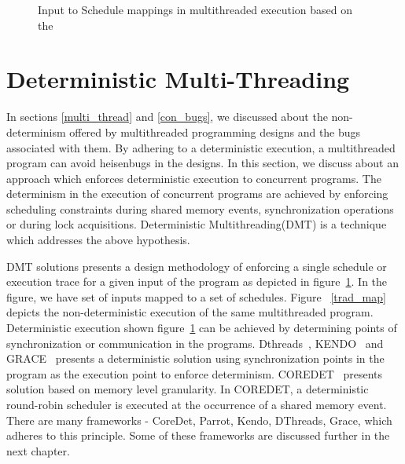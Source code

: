 \begin{figure}[h]
{\label{determinisitic_mapping}}
 \caption{Input to Schedule mappings in multithreaded execution based on the \citet{parrot}}
\end{figure}

\section{Deterministic Multi-Threading \label{sec_dmt}}

In sections \ref{multi_thread} and \ref{con_bugs}, we discussed about the non-determinism offered by multithreaded programming designs and the bugs associated with them. 
By adhering to a deterministic execution, a multithreaded program can avoid heisenbugs in the designs. 
In this section, we discuss about an approach which enforces deterministic execution to concurrent programs. 
The determinism in the execution of concurrent programs are achieved by enforcing scheduling constraints during shared memory events, synchronization operations or during lock acquisitions. 
Deterministic Multithreading(DMT) is a technique which addresses the above hypothesis. 

DMT solutions presents a design methodology of enforcing a single schedule or execution trace for a given input of the program as depicted in figure~\ref{determinisitic_mapping}. 
In the figure, we have set of inputs mapped to a set of schedules. 
Figure~ \ref{trad_map} depicts the non-deterministic execution of the same multithreaded program. 
Deterministic execution shown figure~\ref{determinisitic_mapping} can be achieved by determining points of synchronization or communication in the programs. 
Dthreads~\citep{dthreads}, KENDO~\citep{kendo} and GRACE~\citep{grace} presents a deterministic solution using synchronization points in the program as the execution point to enforce determinism. 
COREDET~\citep{coredet} presents solution based on memory level granularity. 
In COREDET, a deterministic round-robin scheduler is executed at the occurrence of a shared memory event. 
There are many frameworks - CoreDet\cite{coredet}, Parrot\cite{parrot}, Kendo\cite{kendo}, DThreads\cite{dthreads}, Grace\cite{grace}, which adheres to this principle. 
Some of these frameworks are discussed further in the next chapter. 

